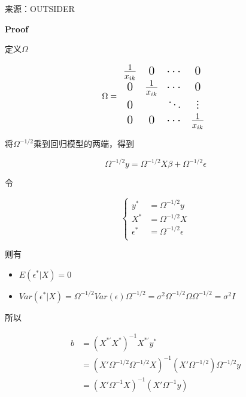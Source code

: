 \documentclass{article}
\begin{document}
\begin{enumerate}
    来源：OUTSIDER

    \textbf{Proof}

    定义$\Omega$

    $$\Large\Omega=
    \Large\begin{array}{cccc}
      \frac{1}{x_{ik}} & 0 & \cdots & 0 \\
      0 & \frac{1}{x_{ik}} & \cdots & 0 \\
      0 &   & \ddots & \vdots \\
      0 & 0 & \cdots & \frac{1}{x_{ik}} \\
    \end{array}
    $$

    将$\Omega^{-1/2}$乘到回归模型的两端，得到

    $$
    \Omega^{-1/2}y=\Omega^{-1/2}X\beta+\Omega^{-1/2}\epsilon
    $$

    令

    $$
    \left\{
      \begin{aligned}
        y^* &= \Omega^{-1/2}y \\
        X^* &= \Omega^{-1/2}X \\
        \epsilon^* &= \Omega^{-1/2}\epsilon \\
      \end{aligned}
    \right.
    $$

    则有

    \begin{itemize}
      \item $E(\epsilon^*|X)=0$
      \item $Var(\epsilon^*|X) = \Omega^{-1/2}Var(\epsilon)\Omega^{-1/2}=\sigma^2\Omega^{-1/2}\Omega\Omega^{-1/2}=\sigma^2I$
    \end{itemize}

    所以

    $$
    \begin{aligned}
      b &= (X^{*'}X^*)^{-1}X^{*'}y^* \\
      &= (X'\Omega^{-1/2}\Omega^{-1/2}X)^{-1}(X'\Omega^{-1/2})\Omega^{-1/2}y \\
      &= (X'\Omega^{-1} X)^{-1}(X'\Omega^{-1}y)
    \end{aligned}
    $$


\end{enumerate}
\end{document}

